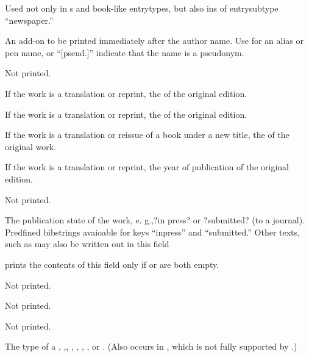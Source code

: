 \documentclass{ltxdockit}[2010/02/12]
\begin{document}
\begin{fieldlist}

Used not only in s and book-like entrytypes, but also ins of entrysubtype ``newspaper.''


An add-on to be printed immediately after the author name. Use for an alias or pen name, or ``[pseud.]'' indicate that the name is a pseudonym.


Not printed.


If the work is a translation or reprint, the  of the original edition. 


If the work is a translation or reprint, the  of the original edition.


If the work is a translation or reissue of a book under a new title, the  of the original work.


If the work is a translation or reprint, the year of publication of the original edition. 


Not printed.


The publication state of the work, e. g.,?in press? or ?submitted? (to a journal). Predfined bibstrings avaioable for keys ``inpress'' and ``submitted.'' Other texts, such as may also be written out in this field

 prints the contents of this field only if  or  are both empty.



Not printed.


Not printed.


Not printed.


The type of a , ,, , , , , or . (Also occurs in , which is not fully supported by .)


\end{fieldlist}
\end{document}
